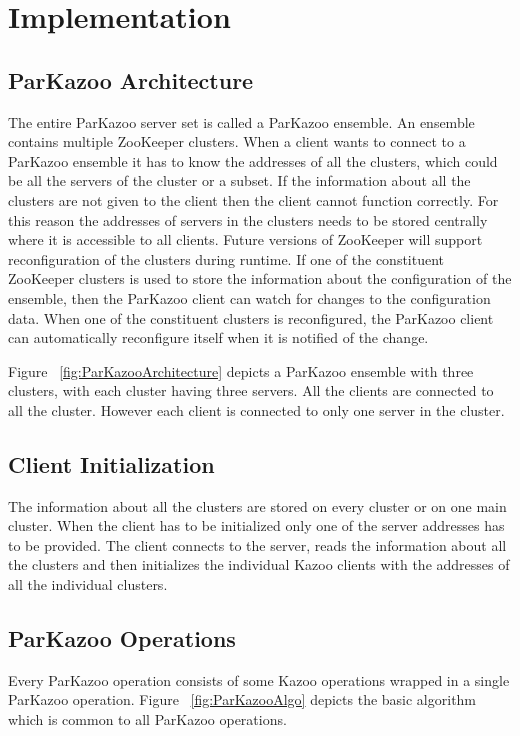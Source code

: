 \chapter{Implementation}

\section{ParKazoo Architecture}
The entire ParKazoo server set is called a ParKazoo ensemble. An ensemble contains multiple ZooKeeper clusters. When a client wants to connect to a ParKazoo ensemble it has to know the addresses of all the clusters, which could be all the servers of the cluster or a subset. If the information about all the clusters are not given to the client then the client cannot function correctly. For this reason the addresses of servers in the clusters needs to be stored centrally where it is accessible to all clients. Future versions of ZooKeeper will support reconfiguration of the clusters during runtime. If one of the constituent ZooKeeper clusters is used to store the information about the configuration of the ensemble, then the ParKazoo client can watch for changes to the configuration data. When one of the constituent clusters is reconfigured, the ParKazoo client can automatically reconfigure itself when it is notified of the change. 

\addvspace{1em}

\addvspace{1em}
Figure ~\ref{fig:ParKazooArchitecture} depicts a ParKazoo ensemble with three clusters, with each cluster having three servers. All the clients are connected to all the cluster. However each client is connected to only one server in the cluster.
  	
\section{Client Initialization}
The information about all the clusters are stored on every cluster or on one main cluster. When the client has to be initialized only one of the server addresses has to be provided. The client connects to the server, reads the information about all the clusters and then initializes the individual Kazoo clients with the addresses of all the individual clusters.

\section{ParKazoo Operations}
Every ParKazoo operation consists of some Kazoo operations wrapped in a single ParKazoo operation. Figure ~\ref{fig:ParKazooAlgo} depicts the basic algorithm which is common to all ParKazoo operations.

